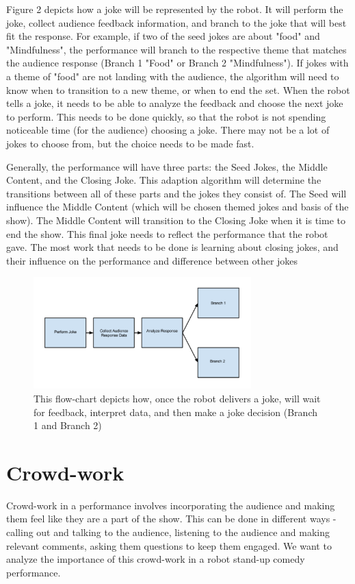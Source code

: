 \documentclass[onecolumn, draftclsnofoot,10pt, compsoc]{IEEEtran}
\begin{document}
Figure 2 depicts how a joke will be represented by the robot. It will perform the joke, collect audience feedback information, and branch to the joke that will best fit the response. For example, if two of the seed jokes are about "food" and "Mindfulness", the performance will branch to the respective theme that matches the audience response (Branch 1 "Food" or Branch 2 "Mindfulness"). If jokes with a theme of "food" are not landing with the audience, the algorithm will need to know when to transition to a new theme, or when to end the set. When the robot tells a joke, it needs to be able to analyze the feedback and choose the next joke to perform. This needs to be done quickly, so that the robot is not spending noticeable time (for the audience) choosing a joke. There may not be a lot of jokes to choose from, but the choice needs to be made fast.

Generally, the performance will have three parts: the Seed Jokes, the Middle Content, and the Closing Joke. This adaption algorithm will determine the transitions between all of these parts and the jokes they consist of. The Seed will influence the Middle Content (which will be chosen themed jokes and basis of the show). The Middle Content will transition to the Closing Joke when it is time to end the show. This final joke needs to reflect the performance that the robot gave. The most work that needs to be done is learning about closing jokes, and their influence on the performance and difference between other jokes

\begin{figure}[H]
  \centering
  \includegraphics[width=0.75\textwidth,height=0.75\textheight,keepaspectratio]{fig1}
  \caption{ This flow-chart depicts how, once the robot delivers a joke, will wait for feedback, interpret data, and then make a joke decision (Branch 1 and Branch 2)}
\end{figure}

\section{Crowd-work}
Crowd-work in a performance involves incorporating the audience and making them feel like they are a part of the show. This can be done in different ways -  calling out and talking to the audience, listening to the audience and making relevant comments, asking them questions to keep them engaged. We want to analyze the importance of this crowd-work in a robot stand-up comedy performance.
\end{document}
